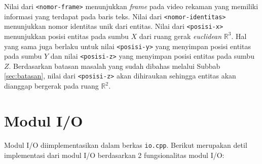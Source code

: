 Nilai dari \texttt{<nomor-frame>} menunjukkan \textit{frame} pada video rekaman yang memiliki informasi yang terdapat pada baris teks. Nilai dari \texttt{<nomor-identitas>} menunjukkan nomor identitas unik dari entitas. Nilai dari \texttt{<posisi-x>} menunjukkan posisi entitas pada sumbu $X$ dari ruang gerak \textit{euclidean} $\mathbb{R}^3$. Hal yang sama juga berlaku untuk nilai \texttt{<posisi-y>} yang menyimpan posisi entitas pada sumbu $Y$ dan nilai \texttt{<posisi-z>} yang menyimpan posisi entitas pada sumbu $Z$. Berdasarkan batasan masalah yang sudah dibahas melalui Subbab \ref{sec:batasan}, nilai dari \texttt{<posisi-z>} akan dihiraukan sehingga entitas akan dianggap bergerak pada ruang $\mathbb{R}^2$.

\section{Modul I/O}
\label{sec:impl-io}

Modul I/O diimplementasikan dalam berkas \texttt{io.cpp}. Berikut merupakan detil implementasi dari modul I/O berdasarkan 2 fungsionalitas modul I/O:

